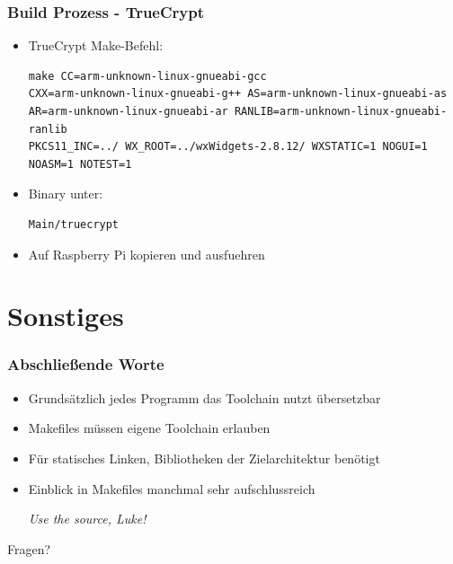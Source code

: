 \documentclass{beamer}
\begin{document}
\begin{frame}[fragile]
\frametitle{Build Prozess - TrueCrypt}
\begin{itemize}
\item TrueCrypt Make-Befehl: 
\begin{tiny}
\begin{verbatim}
make CC=arm-unknown-linux-gnueabi-gcc
CXX=arm-unknown-linux-gnueabi-g++ AS=arm-unknown-linux-gnueabi-as
AR=arm-unknown-linux-gnueabi-ar RANLIB=arm-unknown-linux-gnueabi-ranlib
PKCS11_INC=../ WX_ROOT=../wxWidgets-2.8.12/ WXSTATIC=1 NOGUI=1 NOASM=1 NOTEST=1
\end{verbatim}
\end{tiny}
\item Binary unter:
\begin{verbatim}
Main/truecrypt
\end{verbatim}
\item Auf Raspberry Pi kopieren und ausfuehren
\end{itemize}
\end{frame}

\section{Sonstiges}

\begin{frame}
\frametitle{Abschließende Worte}
\begin{itemize}
\item Grundsätzlich jedes Programm das Toolchain nutzt übersetzbar
\item Makefiles müssen eigene Toolchain erlauben
\item Für statisches Linken, Bibliotheken der Zielarchitektur benötigt
\item Einblick in Makefiles manchmal sehr aufschlussreich\\
\begin{large}
\begin{center}
\textit{Use the source, Luke!}
\end{center}
\end{large}
\end{itemize}
\end{frame}

\begin{frame}
\begin{Huge}
\begin{center}
Fragen?
\end{center}
\end{Huge}
\end{frame}
\end{document}
